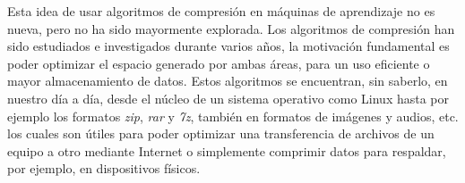 Esta idea de usar algoritmos de compresión en máquinas de aprendizaje no es nueva, pero no ha sido mayormente explorada. Los algoritmos de compresión han sido estudiados e investigados durante varios años, la motivación fundamental es poder optimizar el espacio generado por ambas áreas, para un uso eficiente o mayor almacenamiento de datos. Estos algoritmos se encuentran, sin saberlo, en nuestro día a día, desde el núcleo de un sistema operativo como Linux hasta por ejemplo los formatos \emph{zip}, \emph{rar} y \emph{7z}, también en formatos de imágenes y audios, etc. los cuales son útiles para poder optimizar una transferencia de archivos de un equipo a otro mediante Internet o simplemente comprimir datos para respaldar, por ejemplo, en dispositivos físicos. 






















